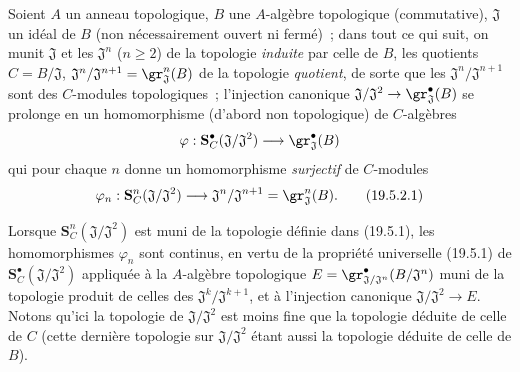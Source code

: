 \begin{env}[19.5.2]
\label{0.19.5.2-fr}
Soient $A$ un anneau topologique, $B$ une $A$-algèbre topologique
(commutative), $\mathfrak J$ un idéal de $B$ (non nécessairement ouvert ni
fermé)~; dans tout ce qui suit, on munit $\mathfrak J$ et les
$\mathfrak J^n$ ($n\geq2$) de la topologie \emph{induite} par celle de $B$,
les quotients $C=B/\mathfrak J$,
$\mathfrak J^n/\mathfrak J^{n+1}=\gr_{\mathfrak J}^n(B)$ de la topologie
\emph{quotient}, de sorte que les $\mathfrak J^n/\mathfrak J^{n+1}$ sont des
$C$-modules topologiques~; l'injection canonique
$\mathfrak J/\mathfrak J^2\to\gr_{\mathfrak J}^\bullet(B)$ se prolonge en un
homomorphisme (d'abord non topologique) de $C$-algèbres
\[
  \varphi:\mathbf S_C^\bullet(\mathfrak J/\mathfrak J^2)
  \longrightarrow\gr_{\mathfrak J}^\bullet(B)
\]
qui pour chaque $n$ donne un homomorphisme \emph{surjectif} de $C$-modules
\begin{equation}
\label{0.19.5.2.1-fr}
  \varphi_n:\mathbf S_C^n(\mathfrak J/\mathfrak J^2)
  \longrightarrow\mathfrak J^n/\mathfrak J^{n+1}
  =\gr_{\mathfrak J}^n(B).
  \tag{19.5.2.1}
\end{equation}

Lorsque $\mathbf S_C^n(\mathfrak J/\mathfrak J^2)$ est muni de la topologie
définie dans (19.5.1), les homomorphismes $\varphi_n$ sont continus, en vertu
de la propriété universelle (19.5.1) de
$\mathbf S_C^\bullet(\mathfrak J/\mathfrak J^2)$
appliquée à la $A$-algèbre
topologique $E=\gr^\bullet_{\mathfrak J/\mathfrak J^n}(B/\mathfrak J^n)$ muni de la
topologie produit de celles des $\mathfrak J^k/\mathfrak J^{k+1}$, et à
l'injection canonique $\mathfrak J/\mathfrak J^2\to E$. Notons qu'ici la
topologie de $\mathfrak J/\mathfrak J^2$ est moins fine que la topologie
déduite de celle de $C$ (cette dernière topologie sur
$\mathfrak J/\mathfrak J^2$ étant aussi la topologie déduite de celle de $B$).
\end{env}

